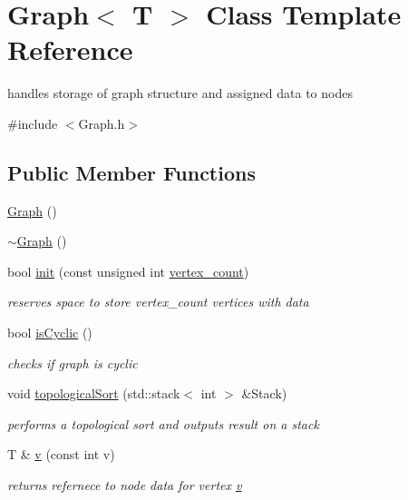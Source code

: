 \hypertarget{class_graph}{}\section{Graph$<$ T $>$ Class Template Reference}
\label{class_graph}


handles storage of graph structure and assigned data to nodes  




{\ttfamily \#include $<$Graph.\+h$>$}

\subsection*{Public Member Functions}
\begin{DoxyCompactItemize}
\item 
\hyperlink{class_graph_a8c626ac04708ae490bba05e1e713cda2}{Graph} ()
\item 
\hyperlink{class_graph_a43eab1460b5c8ceaa526b40e56a0fb0c}{$\sim$\+Graph} ()
\item 
bool \hyperlink{class_graph_aecf48f45702b87cdef1c9ee1dd716267}{init} (const unsigned int \hyperlink{class_graph_a97fdbb2378f3a15690156075f6218d23}{vertex\+\_\+count})
\begin{DoxyCompactList}\small\item\em reserves space to store vertex\+\_\+count vertices with data \end{DoxyCompactList}\item 
bool \hyperlink{class_graph_a6afccd07424a50a65be20c55e0535c0f}{is\+Cyclic} ()
\begin{DoxyCompactList}\small\item\em checks if graph is cyclic \end{DoxyCompactList}\item 
void \hyperlink{class_graph_a7ea10477bee41a1d2059cde0b45e976c}{topological\+Sort} (std\+::stack$<$ int $>$ \&Stack)
\begin{DoxyCompactList}\small\item\em performs a topological sort and outputs result on a stack \end{DoxyCompactList}\item 
T \& \hyperlink{class_graph_ab2853dc3f4d1684e69319b35952f5b77}{v} (const int v)
\begin{DoxyCompactList}\small\item\em returns refernece to node data for vertex \hyperlink{class_graph_ab2853dc3f4d1684e69319b35952f5b77}{v} \end{DoxyCompactList}\item 

\end{DoxyCompactItemize}
